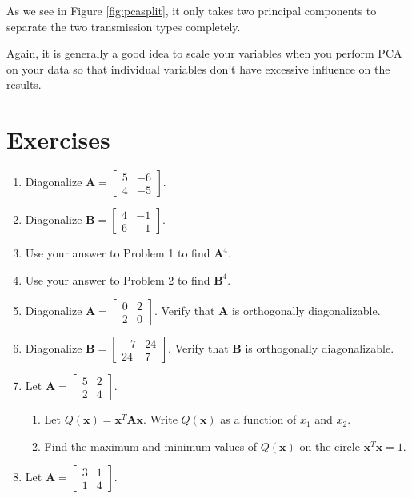 \documentclass[
]{book}
\providecommand{\tightlist}{%
  \setlength{\itemsep}{0pt}\setlength{\parskip}{0pt}}
\theoremstyle{definition}
\theoremstyle{definition}
\theoremstyle{definition}
\theoremstyle{definition}
\theoremstyle{remark}
\begin{document}
As we see in Figure \ref{fig:pcasplit}, it only takes two principal components to separate the two transmission types completely.

Again, it is generally a good idea to scale your variables when you perform PCA on your data so that individual variables don't have excessive influence on the results.

\section{Exercises}\label{exercises-5}

\begin{enumerate}
\def\labelenumi{\arabic{enumi}.}
\item
  Diagonalize \(\mathbf{A}=\begin{bmatrix}5 & -6\\4 & -5\end{bmatrix}.\)
\item
  Diagonalize \(\mathbf{B}=\begin{bmatrix}4 & -1\\6 & -1\end{bmatrix}.\)
\item
  Use your answer to Problem 1 to find \(\mathbf{A}^4.\)
\item
  Use your answer to Problem 2 to find \(\mathbf{B}^4.\)
\item
  Diagonalize \(\mathbf{A}=\begin{bmatrix}0 & 2\\2 & 0\end{bmatrix}.\) Verify that \(\mathbf{A}\) is orthogonally diagonalizable.
\item
  Diagonalize \(\mathbf{B}=\begin{bmatrix}-7 & 24\\24 & 7\end{bmatrix}.\) Verify that \(\mathbf{B}\) is orthogonally diagonalizable.
\item
  Let \(\mathbf{A}=\begin{bmatrix}5&2\\2&4\end{bmatrix}.\)

  \begin{enumerate}
  \def\labelenumii{\alph{enumii}.}
  \tightlist
  \item
    Let \(Q(\mathbf{x})=\mathbf{x}^T\mathbf{A}\mathbf{x}.\) Write \(Q(\mathbf{x})\) as a function of \(x_1\) and \(x_2.\)
  \item
    Find the maximum and minimum values of \(Q(\mathbf{x})\) on the circle \(\mathbf{x}^T\mathbf{x}=1.\)
  \end{enumerate}
\item
  Let \(\mathbf{A}=\begin{bmatrix}3&1\\1&4\end{bmatrix}.\)


\end{enumerate}
\end{document}
